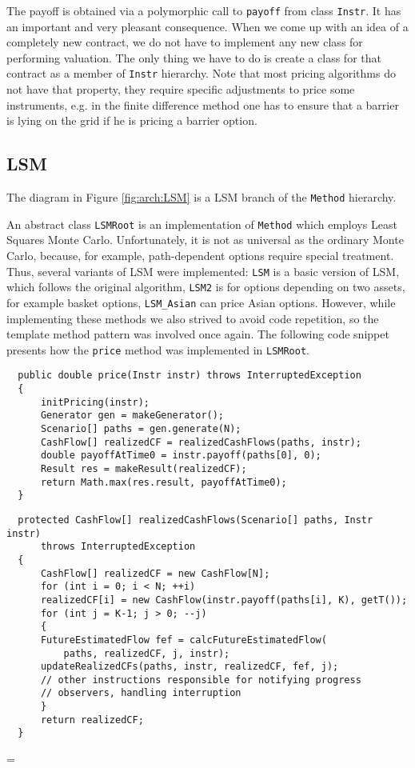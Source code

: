 \documentclass[a4paper,11pt, twoside]{book}
\newenvironment{absolutelynopagebreak}
  {\par\nobreak\vfill\penalty0\vfilneg
   \vtop\bgroup}
  {\par\xdef\tpd{\the\prevdepth}\egroup
   \prevdepth=\tpd}
\theoremstyle{definition}
\theoremstyle{remark}
\newcounter{example}[chapter]
\begin{document}
The payoff is obtained via a polymorphic call to \texttt{payoff} from class \texttt{Instr}. It has an important and very pleasant consequence. When we come up with an idea of a completely new contract, we do not have to implement any new class for performing valuation. The only thing we have to do is create a class for that contract as a member of \texttt{Instr} hierarchy. Note that most pricing algorithms do not have that property, they require specific adjustments to price some instruments, e.g. in the finite difference method one has to ensure that a barrier is lying on the grid if he is pricing a barrier option.
   

\subsection{LSM}
The diagram in Figure \ref{fig:arch:LSM} is a LSM branch of the \texttt{Method} hierarchy.

An abstract class \texttt{LSMRoot} is an implementation of \texttt{Method} which employs Least Squares Monte Carlo. Unfortunately,  it is not as universal as the ordinary Monte Carlo, because, for example, path-dependent options require  special treatment. Thus, several variants of LSM were implemented: \texttt{LSM} is a basic version of LSM, which follows the original algorithm, \texttt{LSM2} is for options depending on two assets, for example basket options, \texttt{LSM\_Asian} can price Asian options.
However, while implementing these methods we also strived to avoid code repetition, so the template method pattern was involved once again. The following code snippet presents how the \texttt{price} method was implemented in \texttt{LSMRoot}.

\begin{lstlisting}
  public double price(Instr instr) throws InterruptedException
  {       
      initPricing(instr);
      Generator gen = makeGenerator();
      Scenario[] paths = gen.generate(N);
      CashFlow[] realizedCF = realizedCashFlows(paths, instr);
      double payoffAtTime0 = instr.payoff(paths[0], 0);
      Result res = makeResult(realizedCF);
      return Math.max(res.result, payoffAtTime0);
  }
\end{lstlisting} 
\begin{absolutelynopagebreak}
\begin{lstlisting}
  protected CashFlow[] realizedCashFlows(Scenario[] paths, Instr instr)
	  throws InterruptedException
  {
      CashFlow[] realizedCF = new CashFlow[N];
      for (int i = 0; i < N; ++i)
	  realizedCF[i] = new CashFlow(instr.payoff(paths[i], K), getT());
      for (int j = K-1; j > 0; --j)
      {
	  FutureEstimatedFlow fef = calcFutureEstimatedFlow(
	      paths, realizedCF, j, instr);
	  updateRealizedCFs(paths, instr, realizedCF, fef, j);
	  // other instructions responsible for notifying progress
	  // observers, handling interruption
      }       
      return realizedCF;
  }
\end{lstlisting} 
\end{absolutelynopagebreak}
\end{document}
